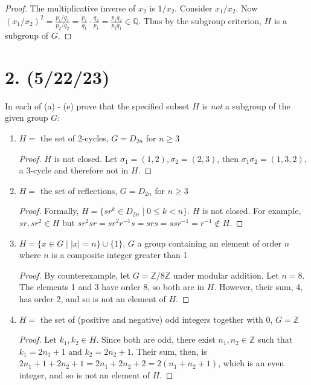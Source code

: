 \documentclass{article}
\begin{document}
\begin{enumerate}[label=(\alph*)]
\begin{proof}
            The multiplicative inverse of $x_2$ is $1/x_2$. Consider $x_1/x_2$. Now $(x_1/x_2)^2 = \frac{p_1/q_1}{p_2/q_2} = \frac{p_1}{q_1} \cdot \frac{q_2}{p_1} = \frac{p_1q_2}{p_2q_1} \in \mathbb{Q}$. Thus by the subgroup criterion, $H$ is a subgroup of $G$.
          \end{proof}
\end{enumerate}

\section*{2. (5/22/23)}

In each of (a) - (e) prove that the specified subset $H$ is \emph{not} a subgroup of the given group $G$:

\begin{enumerate}[label=(\alph*)]
    \item $H = $ the set of 2-cycles, $G = D_{2n}$ for $n \geq 3$
          \begin{proof}
            $H$ is not closed. Let $\sigma_1 = (1, 2), \sigma_2 = (2, 3)$, then $\sigma_1 \sigma_2 = (1, 3, 2)$, a 3-cycle and therefore not in $H$.
          \end{proof}
    \item $H = $ the set of reflections, $G = D_{2n}$ for $n \geq 3$
          \begin{proof}
            Formally, $H = \{ sr^k \in D_{2n} \mid 0 \leq k < n \}$. $H$ is not closed. For example, $sr, sr^2 \in H$ but $sr^2sr = sr^2r^{-1}s = srs = ssr^{-1} = r^{-1} \notin H$.
          \end{proof}
    \item $H = \{ x \in G \mid |x| = n \} \cup \{ 1 \}$, $G$ a group containing an element of order $n$ where $n$ is a composite integer greater than 1
          \begin{proof}
            By counterexample, let $G = \mathbb{Z}/8\mathbb{Z}$ under modular addition. Let $n = 8$. The elements 1 and 3 have order 8, so both are in $H$. However, their sum, 4, has order 2, and so is not an element of $H$.
          \end{proof}
    \item $H = $ the set of (positive and negative) odd integers together with 0, $G = \mathbb{Z}$
          \begin{proof}
            Let $k_1, k_2 \in H$. Since both are odd, there exist $n_1, n_2 \in \mathbb{Z}$ such that $k_1 = 2n_1 + 1 \text{ and } k_2 = 2n_2 + 1$. Their sum, then, is $2n_1 + 1 + 2n_2 + 1 = 2n_1 + 2n_2 + 2 = 2(n_1 + n_2 + 1)$, which is an even integer, and so is not an element of $H$.

\end{proof}
\end{enumerate}
\end{document}
